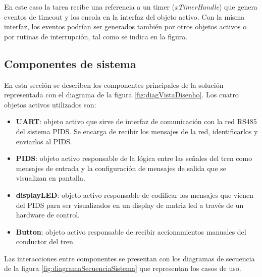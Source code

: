 En este caso la tarea recibe una referencia a un timer (\textit{xTimerHandle}) que genera eventos de timeout y los encola en la interfaz del objeto activo. Con la misma interfaz, los eventos podrían ser generados también por otros objetos activos o por rutinas de interrupción, tal como se indica en la figura.\\




\pagebreak
\subsection{Componentes de sistema}

En esta sección se describen los componentes principales de la solución representada con el diagrama de la figura \ref{fig:diagVistaDisenho}. Los cuatro objetos activos utilizados son:\\
\begin{itemize}
\item \textbf{UART}: objeto activo que sirve de interfaz de comunicación con la red RS485 del sistema PIDS. Se encarga de recibir los mensajes de la red, identificarlos y enviarlos al PIDS.
\item \textbf{PIDS}: objeto activo responsable de la lógica entre las señales del tren como mensajes de entrada y la configuración de mensajes de salida que se visualizan en pantalla. 
\item \textbf{displayLED}: objeto activo responsable de codificar los mensajes que vienen del PIDS para ser visualizados en un display de matriz led a través de un hardware de control.
\item \textbf{Button}: objeto activo responsable de recibir accionamientos manuales del conductor del tren.
\end{itemize}

Las interacciones entre componentes se presentan con los diagramas de secuencia de la figura \ref{fig:diagramaSecuenciaSistema} que representan los casos de uso.

